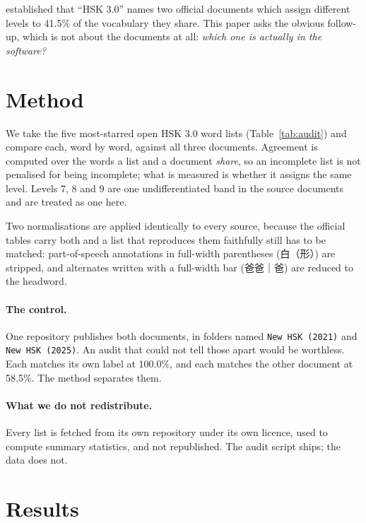 \documentclass[11pt]{article}
\begin{document}
\citet{serrano2026whichhsk} established that ``HSK 3.0'' names two official
documents which assign different levels to 41.5\% of the vocabulary they share.
This paper asks the obvious follow-up, which is not about the documents at all:
\emph{which one is actually in the software?}

\section{Method}

We take the five most-starred open HSK 3.0 word lists (Table~\ref{tab:audit}) and
compare each, word by word, against all three documents. Agreement is computed
over the words a list and a document \emph{share}, so an incomplete list is not
penalised for being incomplete; what is measured is whether it assigns the same
level. Levels 7, 8 and 9 are one undifferentiated band in the source documents
and are treated as one here.

Two normalisations are applied identically to every source, because the official
tables carry both and a list that reproduces them faithfully still has to be
matched: part-of-speech annotations in full-width parentheses (白（形）) are
stripped, and alternates written with a full-width bar (爸爸｜爸) are reduced to
the headword.

\paragraph{The control.} One repository publishes both documents, in folders
named \texttt{New HSK (2021)} and \texttt{New HSK (2025)}. An audit that could
not tell those apart would be worthless. Each matches its own label at 100.0\%,
and each matches the other document at 58.5\%. The method separates them.

\paragraph{What we do not redistribute.} Every list is fetched from its own
repository under its own licence, used to compute summary statistics, and not
republished. The audit script ships; the data does not.

\section{Results}
\end{document}
